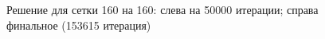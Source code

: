 \documentclass[12pt]{article}
\begin{document}
\begin{figure}[htb!]
\begin{minipage}[h]{0.49\linewidth}
\end{minipage}
\hfill
\begin{minipage}[h]{0.49\linewidth}
\end{minipage}
\caption{Решение для сетки 160 на 160: слева на 50000 итерации; справа финальное (153615 итерация)}
\end{figure}
\end{document}
